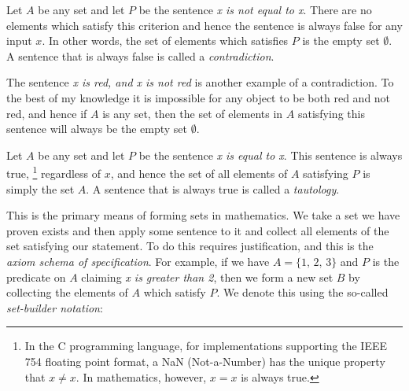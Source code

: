             \begin{example}
                Let $A$ be any set and let $P$ be the sentence
                \textit{x is not equal to x}. There are no elements which
                satisfy this criterion and hence the sentence is always false
                for any input $x$. In other words, the set of elements which
                satisfies $P$ is the empty set $\emptyset$. A sentence that is
                always false is called a
                \textit{contradiction}.
            \end{example}
            \begin{example}
                The sentence \textit{x is red, and x is not red} is another
                example of a contradiction. To the best of my knowledge it is
                impossible for any object to be both red and not red, and hence
                if $A$ is any set, then the set of elements in $A$ satisfying
                this sentence will always be the empty set $\emptyset$.
            \end{example}
            \begin{example}
                Let $A$ be any set and let $P$ be the sentence
                \textit{x is equal to x}. This sentence is always true,%
                \footnote{
                    In the C programming language, for implementations
                    supporting the IEEE 754 floating point format, a NaN
                    (Not-a-Number) has the unique property that $x\ne{x}$.
                    In mathematics, however, $x=x$ is always true.
                }
                regardless of $x$, and hence the set of all elements of $A$
                satisfying $P$ is simply the set $A$. A sentence that is always
                true is called a \textit{tautology}.
            \end{example}
            This is the primary means of forming sets in mathematics. We take a
            set we have proven exists and then apply some sentence to it and
            collect all elements of the set satisfying our statement. To do
            this requires justification, and this is the
            \textit{axiom schema of specification}. For example, if we have
            $A=\{1,\,2,\,3\}$ and $P$ is the predicate on $A$ claiming
            \textit{x is greater than 2}, then we form a new set $B$ by
            collecting the elements of $A$ which satisfy $P$. We denote this
            using the so-called
            \textit{set-builder notation}:
